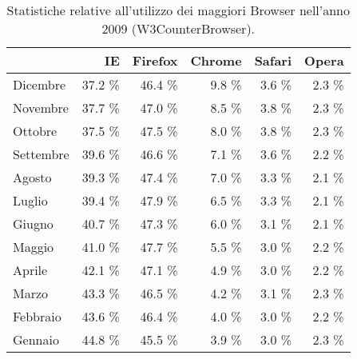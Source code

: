 \begin{table}
\begin{center}
\begin{tabular}{||p{4cm}|*{5}{r|}|}
	\hline
	\centering {\bfseries 2009}  & IE & Firefox & Chrome & Safari & Opera \\
	\hline
	\hline
	Dicembre & 37.2 \% & 46.4 \% & 9.8 \% & 3.6 \% & 2.3 \% \\
	\hline
	Novembre & 37.7 \% & 47.0 \% & 8.5 \% & 3.8 \% & 2.3 \% \\
	\hline
	Ottobre & 37.5 \% & 47.5 \% & 8.0 \% & 3.8 \% & 2.3 \% \\
	\hline
	Settembre & 39.6 \% & 46.6 \% & 7.1 \% & 3.6 \% & 2.2 \% \\
	\hline
	Agosto & 39.3 \% & 47.4 \% & 7.0 \% & 3.3 \% & 2.1 \% \\
	\hline
	Luglio & 39.4 \% & 47.9 \% & 6.5 \% & 3.3 \% & 2.1 \% \\
	\hline
	Giugno & 40.7 \% & 47.3 \% & 6.0 \% & 3.1 \% & 2.1 \% \\
	\hline
	Maggio & 41.0 \% & 47.7 \% & 5.5 \% & 3.0 \% & 2.2 \% \\
	\hline
	Aprile & 42.1 \% & 47.1 \% & 4.9 \% & 3.0 \% & 2.2 \% \\
	\hline
	Marzo & 43.3 \% & 46.5 \% & 4.2 \% & 3.1 \% & 2.3 \% \\
	\hline
	Febbraio & 43.6 \% & 46.4 \% & 4.0 \% & 3.0 \% & 2.2 \% \\
	\hline
	Gennaio & 44.8 \% & 45.5 \% & 3.9 \% & 3.0 \% & 2.3 \% \\
	\hline
\end{tabular}
 \caption{Statistiche relative all'utilizzo dei maggiori Browser nell'anno 2009 (W3CounterBrowser).}
 \label{tab:brow_stats_2009}
\end{center}
\end{table}

